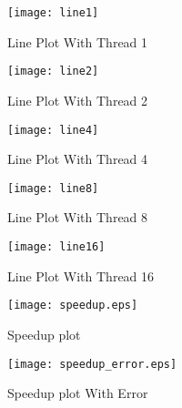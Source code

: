 \documentclass{article}
\begin{document}
\newpage
\begin{figure*}[!ht]
    \centering
    \texttt{[image: line1]}
    \caption{Line Plot With Thread 1}
    \label{fig:sc1}
\end{figure*}
\begin{figure*}[!ht]
    \centering
    \texttt{[image: line2]}
    \caption{Line Plot With Thread 2}
    \label{fig:sc2}
\end{figure*}
\begin{figure*}[!ht]
    \centering
    \texttt{[image: line4]}
    \caption{Line Plot With Thread 4}
    \label{fig:sc4}
\end{figure*}
\begin{figure*}[!ht]
    \centering
    \texttt{[image: line8]}
    \caption{Line Plot With Thread 8}
    \label{fig:sc8}
\end{figure*}
\begin{figure*}[!ht]
    \centering
    \texttt{[image: line16]}
    \caption{Line Plot With Thread 16}
    \label{fig:ln16}
\end{figure*}
\newpage
\begin{figure}[!ht]
\centering
    \texttt{[image: speedup.eps]}
    \caption{Speedup plot}
\end{figure}

\begin{figure}[!ht]
\centering
    \texttt{[image: speedup\_error.eps]}
    \caption{Speedup plot With Error }
\end{figure}
\end{document}
